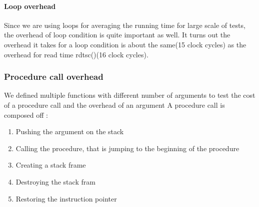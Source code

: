 \paragraph{Loop overhead}
Since we are using loops for averaging the running time for large scale of tests, the overhead of loop condition is quite important as well. It turns out the overhead it takes for a loop condition is about the same(15 clock cycles) as the overhead for read time rdtsc()(16 clock cycles).

\subsubsection{Procedure call overhead}
We defined multiple functions with different number of arguments to test the
cost of a procedure call and the overhead of an argument
A procedure call is composed off :
\begin{enumerate}
\item Pushing the argument on the stack
\item Calling the procedure, that is jumping to the beginning of the procedure
\item Creating a stack frame
\item Destroying the stack fram
\item Restoring the instruction pointer
\end{enumerate}



